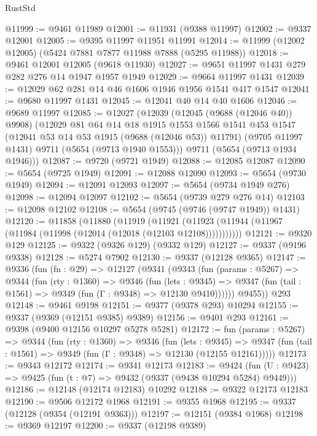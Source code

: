 \begin{lexlean}{RustStd}
\begin{coremodule}
@11999 := @9461 @11989
@12001 := @11931 (@9388 @11997)
@12002 := @9337 @12001
@12005 := @9395 @11997 @11951 @11991
@12014 := @11999 (@12002 @12005) (@5424 @7881 @7877 @11988 @7888 (@5295 @11988))
@12018 := @9461 @12001 @12005 (@9618 @11930)
@12027 := @9651 @11997 @1431 @279 @282 @276 @14 @1947 @1957 @1949
@12029 := @9664 @11997 @1431
@12039 := @12029 @62 @281 @14 @46 @1606 @1946 @1956 @1541 @417 @1547
@12041 := @9680 @11997 @1431
@12045 := @12041 @40 @14 @40 @1606
@12046 := @9689 @11997
@12085 := @12027
    (@12039
      (@12045 (@9688 (@12046 @40)) @9908)
      (@12029
        @81
        @64
        @14
        @18
        @1915
        @1553
        @1566
        @1541
        @453
        @1547
        (@12041 @53 @14 @53 @1915 (@9688 (@12046 @53)) @11791)
        (@9705 @11997 @1431)
        @9711
        (@5654 (@9713 @1940 @1553)))
      @9711
      (@5654 (@9713 @1934 @1946)))
@12087 := @9720 (@9721 @1949)
@12088 := @12085 @12087
@12090 := @5654 (@9725 @1949)
@12091 := @12088 @12090
@12093 := @5654 (@9730 @1949)
@12094 := @12091 @12093
@12097 := @5654 (@9734 @1949 @276)
@12098 := @12094 @12097
@12102 := @5654 (@9739 @279 @276 @14)
@12103 := @12098 @12102
@12108 := @5654 (@9745 (@9746 (@9747 @1949)) @1431)
@12120 := @11858
    (@11880
      (@11919
        (@11921 (@11923 (@11944 (@11967 (@11984 (@11998 (@12014 (@12018 (@12103 @12108)))))))))))
@12121 := @9320 @129
@12125 := @9322 (@9326 @129) (@9332 @129)
@12127 := @9337 (@9196 @9338)
@12128 := @5274 @7902
@12130 := @9337 (@12128 @9365)
@12147 := @9336
    (fun (fn : @29) =>
    @12127
      (@9341
        (@9343
          (fun (params : @5267) =>
          @9344
            (fun (rty : @1360) =>
            @9346
              (fun (lets : @9345) =>
              @9347 (fun (tail : @1561) => @9349 (fun (Γ : @9348) => @12130 @9410))))))
        @9455))
    @293
@12148 := @9461 @9198
@12151 := @9377 (@9378 @293) @10294
@12155 := @9337 (@9369 (@12151 @9385) @9389)
@12156 := @9401 @293
@12161 := @9398 (@9400 @12156 @10297 @5278 @5281)
@12172 := fun (params : @5267) =>
  @9344
    (fun (rty : @1360) =>
    @9346
      (fun (lets : @9345) =>
      @9347 (fun (tail : @1561) => @9349 (fun (Γ : @9348) => @12130 (@12155 @12161)))))
@12173 := @9343 @12172
@12174 := @9341 @12173
@12183 := @9424
    (fun (U : @9423) => @9425 (fun (t : @7) => @9432 (@9337 (@9438 @10294 @5284) @9449)))
@12186 := @12148 (@12174 @12183) @10292
@12188 := @9322 @12173 @12183
@12190 := @9506 @12172 @1968
@12191 := @9355 @1968
@12195 := @9337 (@12128 (@9354 (@12191 @9363)))
@12197 := @12151 (@9384 @1968)
@12198 := @9369 @12197
@12200 := @9337 (@12198 @9389)

\end{coremodule}
\end{lexlean}
